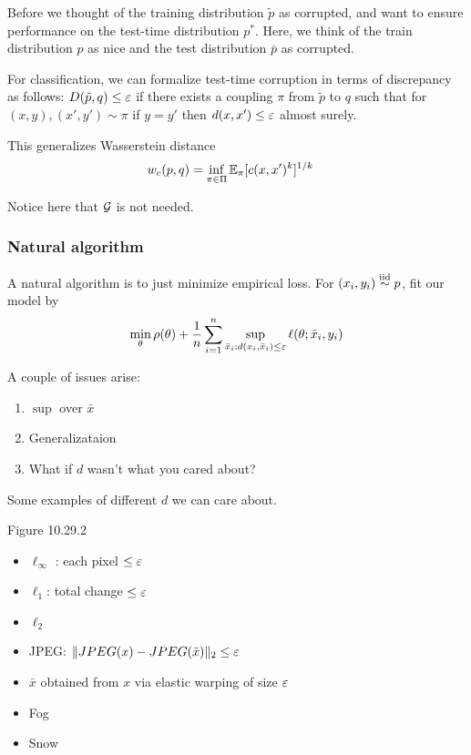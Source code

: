 Before we thought of the training distribution $\tilde{p}$
as corrupted, and want to ensure performance on the test-time
distribution $p^*$.
Here, we think of the train distribution $p$ as nice and the
test distribution $\bar{p}$ as corrupted.

For classification, we can formalize test-time corruption in terms of
discrepancy as follows:
$D(\tilde{p}, q) \leq \varepsilon$ if there exists a coupling $\pi$ from
$\tilde{p}$ to $q$ such that for $(x,y), (x',y') \sim \pi$
if $y = y'$ then $d(x,x') \leq \varepsilon$ almost surely.

This generalizes Wasserstein distance
\begin{align}
  w_c(p, q) &= \inf_{\pi \in \Pi} \mathbb{E}_\pi[c(x,x')^k]^{1/k}
\end{align}

Notice here that $\mathcal{G}$ is not needed.

\subsubsection{Natural algorithm}%

A natural algorithm is to just minimize empirical loss.
For $(x_i, y_i) \overset{\text{iid}}{\sim} p$, fit our model by
\begin{align}
  \min_\theta
  \rho(\theta)
  + \frac{1}{n}  \sum_{i=1}^n
  \sup_{\bar{x}_i : d(x_i, \bar{x}_i) \leq \varepsilon}
  \ell(\theta; \bar{x}_i, y_i)
\end{align}

A couple of issues arise:
\begin{enumerate}
  \item $\sup$ over $\bar{x}$
  \item Generalizataion
  \item What if $d$ wasn't what you cared about?
\end{enumerate}

Some examples of different $d$ we can care about.

Figure 10.29.2

\begin{itemize}
  \item $\ell_\infty$ : each pixel $\leq \varepsilon$
  \item $\ell_1$: total change $\leq \varepsilon$
  \item $\ell_2$
  \item JPEG: $\|JPEG(x) - JPEG(\bar{x})\|_2 \leq \varepsilon$
  \item $\bar{x}$ obtained from $x$ via elastic warping of size $\varepsilon$
  \item Fog
  \item Snow
\end{itemize}

